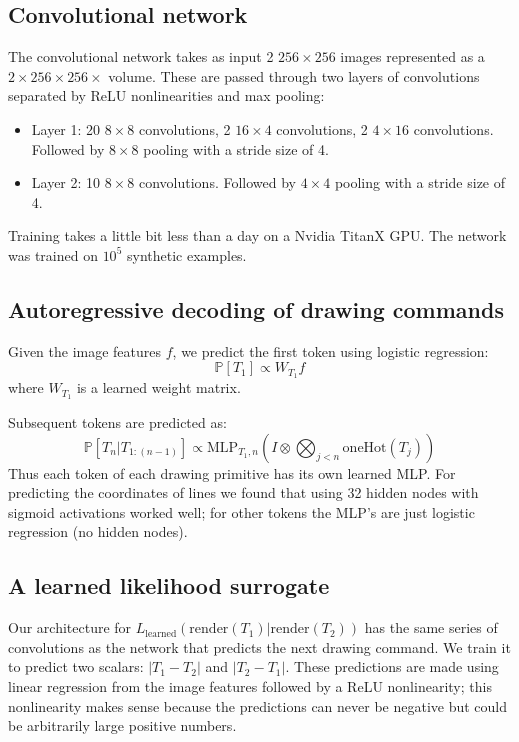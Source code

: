 \documentclass{article}
\newcommand{\probability}{\mathds{P}} %
\begin{document}
\subsection{Convolutional network}
The convolutional network takes as input 2 $256\times 256$ images
represented as a $2\times 256\times 256\times$ volume. These are
passed through two layers of convolutions separated by ReLU
nonlinearities and max pooling:
\begin{itemize}
\item Layer 1: 20 $8\times 8$ convolutions, 2 $16\times 4$ convolutions, 2 $4\times 16$ convolutions. Followed by $8\times 8$ pooling with a stride size of 4.
\item Layer 2: 10 $8\times 8$ convolutions. Followed by $4\times 4$ pooling with a stride size of 4.
\end{itemize}
Training takes a little bit less than a day on a Nvidia TitanX GPU.
The network was trained on $10^5$ synthetic examples.

\subsection{Autoregressive decoding of drawing commands}

Given the image features $f$, we predict the first token using logistic regression:
\begin{equation}
  \probability [T_1]\propto W_{T_1}f
\end{equation}
where $W_{T_1}$ is a learned weight matrix.

Subsequent tokens are predicted as:
\begin{equation}
  \probability [T_n|T_{1:(n - 1)}]\propto \text{MLP}_{T_1,n}(I \otimes \bigotimes_{j < n} \text{oneHot}(T_j))
\end{equation}
Thus each token of each drawing primitive has its own learned MLP.
For predicting the coordinates of lines we found that using 32 hidden nodes with sigmoid activations worked well;
for other tokens the MLP's are just logistic regression (no hidden nodes).

\subsection{A learned likelihood surrogate}

Our architecture for
$L_{\text{learned}}(\text{render}(T_1)|\text{render}(T_2))$ has the
same series of convolutions as the network that predicts the next
drawing command. We train it to predict two scalars: $|T_1 - T_2|$ and
$|T_2 - T_1|$.  These predictions are made using linear regression
from the image features followed by a ReLU nonlinearity; this
nonlinearity makes sense because the predictions can never be negative
but could be arbitrarily large positive numbers.
\end{document}
